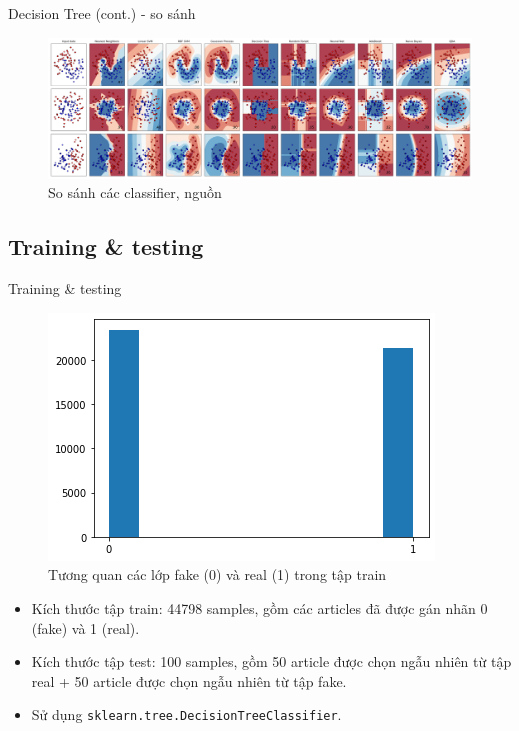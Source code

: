 \documentclass[aspectratio=169,xcolor=dvipsnames]{beamer}
\begin{document}
\begin{frame}{Decision Tree (cont.) - so sánh}
    \begin{figure}
        \centering
        \includegraphics[scale=.2]{img/classifiers-comparison.png}
        \caption{So sánh các classifier, nguồn \cite{scikit-learn}}
    \end{figure}
\end{frame}

\subsection{Training \& testing}
\begin{frame}{Training \& testing}
\begin{figure}
\includegraphics[width=0.35\linewidth]{img/real-fake-in-train.png}
\caption{Tương quan các lớp fake (0) và real (1) trong tập train}
\end{figure}

\begin{itemize}
\item Kích thước tập train: 44798 samples, gồm các articles đã được gán nhãn 0 (fake) và 1 (real).
\item Kích thước tập test: 100 samples, gồm 50 article được chọn ngẫu nhiên từ tập real + 50 article được chọn ngẫu nhiên từ tập fake.
\item Sử dụng \texttt{sklearn.tree.DecisionTreeClassifier}.
\end{itemize}
\end{frame}
\end{document}
